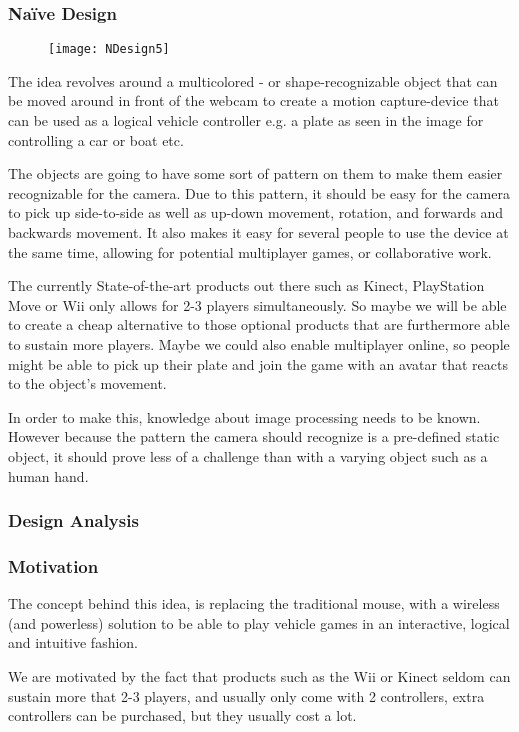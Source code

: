 \subsubsection*{Naïve Design}
\begin{figure}[h]
\centering
\texttt{[image: NDesign5]}
\caption{}
\label{fig:ndesign5}
\end{figure}

The idea revolves around a multicolored - or shape-recognizable object that can be moved around in front of the webcam to create a motion capture-device that can be used as a logical vehicle controller e.g. a plate as seen in the image for controlling a car or boat etc.
\bigskip

The objects are going to have some sort of pattern on them to make them easier recognizable for the camera. Due to this pattern, it should be easy for the camera to pick up side-to-side as well as up-down movement, rotation, and forwards and backwards movement. It also makes it easy for several people to use the device at the same time, allowing for potential multiplayer games, or collaborative work.
\bigskip
 
The currently State-of-the-art products out there such as Kinect, PlayStation Move or Wii only allows for 2-3 players simultaneously. So maybe we will be able to create a cheap alternative to those optional products that are furthermore able to sustain more players. Maybe we could also enable multiplayer online, so people might be able to pick up their plate and join the game with an avatar that reacts to the object’s movement.
\bigskip
	
In order to make this, knowledge about image processing needs to be known. However because the pattern the camera should recognize is a pre-defined static object, it should prove less of a challenge than with a varying object such as a human hand.

\subsubsection*{Design Analysis}
\subsubsection*{Motivation}
The concept behind this idea, is replacing the traditional mouse, with a wireless (and powerless) solution to be able to play vehicle games in an interactive, logical and intuitive fashion. 

We are motivated by the fact that products such as the Wii or Kinect seldom can sustain more that 2-3 players, and usually only come with 2 controllers, extra controllers can be purchased, but they usually cost a lot.


